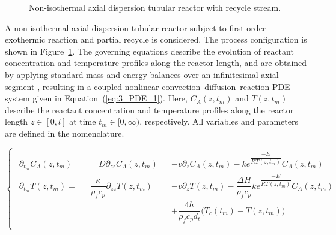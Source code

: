 \begin{figure}[!htbp]
    \caption{Non-isothermal axial dispersion tubular reactor with recycle stream.}
    \label{fig:3_reactor_scheme}
\end{figure}


A non-isothermal axial dispersion tubular reactor subject to first-order exothermic reaction and partial recycle is considered. The process configuration is shown in Figure~\ref{fig:3_reactor_scheme}. The governing equations describe the evolution of reactant concentration and temperature profiles along the reactor length, and are obtained by applying standard mass and energy balances over an infinitesimal axial segment \autocite{levenspiel1998chemical}, resulting in a coupled nonlinear convection--diffusion--reaction PDE system given in Equation~(\ref{eq:3_PDE_1}). Here, $C_{A}(z, t_m)$ and $T(z, t_m)$ describe the reactant concentration and temperature profiles along the reactor length $z \in [0, l]$ at time $t_m \in [0, \infty)$, respectively. All variables and parameters are defined in the nomenclature.

\begin{small}
\begin{equation} \label{eq:3_PDE_1}
\begin{cases}
\begin{alignedat}{2}
        \partial_{t_m} C_{A}(z, t_m) = &\hspace{1em} D \partial_{zz} C_{A}(z, t_m)              &&- v \partial_{z} C_{A}(z, t_m) -                              k e^{\dfrac{-E}{R T(z, t_m)}} C_{A}(z, t_m)\\[2.0ex]
        \partial_{t_m} T(z, t_m) = &\dfrac{\kappa}{\rho_f c_p} \partial_{zz} T(z, t_m) &&- v \partial_{z} T(z, t_m) - \dfrac{\Delta H}{\rho_f c_p} k e^{\dfrac{-E}{R T(z, t_m)}} C_{A}(z, t_m)\\[1.2ex]
        &&& + \dfrac{4h}{\rho_f c_p d_t} \bigl( T_c(t_m) - T(z, t_m) \bigr) \\
    \end{alignedat}
\end{cases}
\end{equation}
\end{small}

